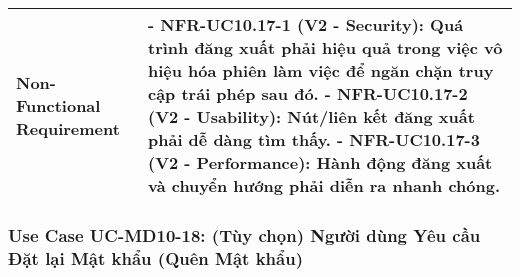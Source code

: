 \begin{longtable}{|m{4cm}|p{11cm}|}
\hline
Non-Functional Requirement & - \textbf{NFR-UC10.17-1 (V2 - Security):} Quá trình đăng xuất phải hiệu quả trong việc vô hiệu hóa phiên làm việc để ngăn chặn truy cập trái phép sau đó. \newline - \textbf{NFR-UC10.17-2 (V2 - Usability):} Nút/liên kết đăng xuất phải dễ dàng tìm thấy. \newline - \textbf{NFR-UC10.17-3 (V2 - Performance):} Hành động đăng xuất và chuyển hướng phải diễn ra nhanh chóng. \\
\hline
\end{longtable}

\subsubsection{Use Case UC-MD10-18: (Tùy chọn) Người dùng Yêu cầu Đặt lại Mật khẩu (Quên Mật khẩu)}
